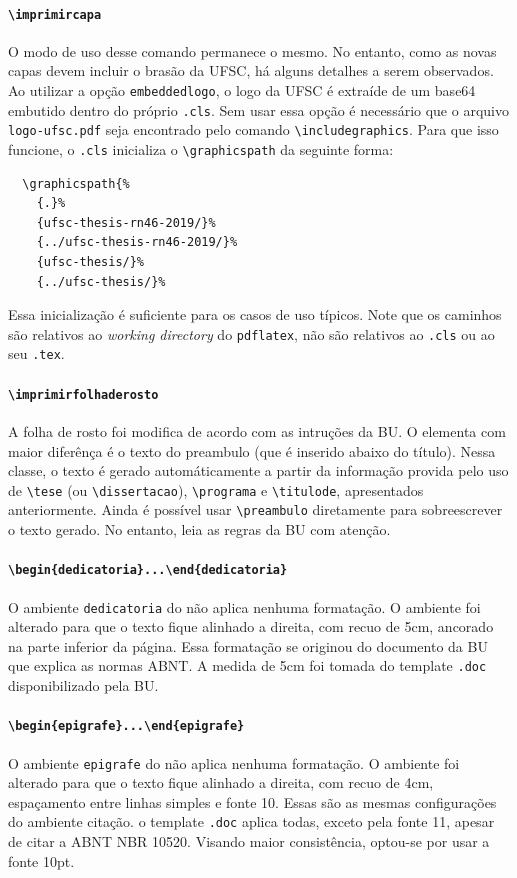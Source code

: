 \documentclass[embeddedlogo]{ufsc-thesis-rn46-2019}
\newcommand{\lacmd}[1]{\texttt{\textbackslash{}#1}}
\newcommand{\laenv}[1]{\texttt{\textbackslash{}begin\{#1\}...\textbackslash{}end\{#1\}}}
\begin{document}
\paragraph*{\lacmd{imprimircapa}} O modo de uso desse comando permanece o
mesmo. No entanto, como as novas capas devem incluir o brasão da UFSC, há alguns
detalhes a serem observados. Ao utilizar a opção \texttt{embeddedlogo}, o logo
da UFSC é extraíde de um base64 embutido dentro do próprio \texttt{.cls}. Sem
usar essa opção é necessário que o arquivo \texttt{logo-ufsc.pdf} seja
encontrado pelo comando \lacmd{includegraphics}. Para que isso funcione, o
\texttt{.cls} inicializa o \lacmd{graphicspath} da seguinte forma:

\begin{verbatim}
  \graphicspath{%
    {.}%
    {ufsc-thesis-rn46-2019/}%
    {../ufsc-thesis-rn46-2019/}%
    {ufsc-thesis/}%
    {../ufsc-thesis/}%
\end{verbatim}

Essa inicialização é suficiente para os casos de uso típicos. Note que os
caminhos são relativos ao \emph{working directory} do \texttt{pdflatex}, não são
relativos ao \texttt{.cls} ou ao seu \texttt{.tex}.

\paragraph*{\lacmd{imprimirfolhaderosto}} A folha de rosto foi modifica de
acordo com as intruções da BU. O elementa com maior diferênça é o texto do
preambulo (que é inserido abaixo do título). Nessa classe, o texto é gerado
automáticamente a partir da informação provida pelo uso de \lacmd{tese} (ou
\lacmd{dissertacao}), \lacmd{programa} e \lacmd{titulode}, apresentados
anteriormente. Ainda é possível usar \lacmd{preambulo} diretamente para
sobreescrever o texto gerado. No entanto, leia as regras da BU com atenção.

\paragraph*{\laenv{dedicatoria}}
O ambiente \texttt{dedicatoria} do \abnTeX não aplica nenhuma formatação. O
ambiente foi alterado para que o texto fique alinhado a direita, com recuo de
5cm, ancorado na parte inferior da página. Essa formatação se originou do
documento da BU que explica as normas ABNT. A medida de 5cm foi tomada do
template \texttt{.doc} disponibilizado pela BU.

\paragraph*{\laenv{epigrafe}}
O ambiente \texttt{epigrafe} do \abnTeX não aplica nenhuma formatação. O
ambiente foi alterado para que o texto fique alinhado a direita, com recuo de
4cm, espaçamento entre linhas simples e fonte 10. Essas são as mesmas
configurações do ambiente citação. o template \texttt{.doc} aplica todas, exceto
pela fonte 11, apesar de citar a ABNT NBR 10520. Visando maior consistência,
optou-se por usar a fonte 10pt.
\end{document}
